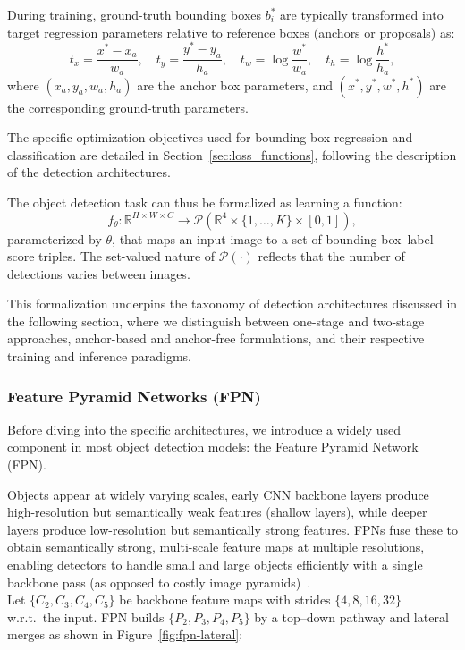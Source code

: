 During training, ground-truth bounding boxes $b_i^\ast$ are typically transformed into target regression parameters relative to reference boxes (anchors or proposals) as:
$$
t_x = \frac{x^\ast - x_a}{w_a}, \quad
t_y = \frac{y^\ast - y_a}{h_a}, \quad
t_w = \log \frac{w^\ast}{w_a}, \quad
t_h = \log \frac{h^\ast}{h_a},
$$
where $(x_a, y_a, w_a, h_a)$ are the anchor box parameters, and $(x^\ast, y^\ast, w^\ast, h^\ast)$ are the corresponding ground-truth parameters.

The specific optimization objectives used for bounding box regression and classification are detailed in Section~\ref{sec:loss_functions}, following the description of the detection architectures.

The object detection task can thus be formalized as learning a function:
$$
f_\theta: \mathbb{R}^{H \times W \times C} \to \mathcal{P}(\mathbb{R}^4 \times \{1, \dots, K\} \times [0,1]),
$$
parameterized by $\theta$, that maps an input image to a set of bounding box--label--score triples.
The set-valued nature of $\mathcal{P}(\cdot)$ reflects that the number of detections varies between images.

This formalization underpins the taxonomy of detection architectures discussed in the following section, where we distinguish between one-stage and two-stage approaches, anchor-based and anchor-free formulations, and their respective training and inference paradigms.

\subsubsection{Feature Pyramid Networks (FPN)}
Before diving into the specific architectures, we introduce a widely used component in most object detection models: the Feature Pyramid Network (FPN).

Objects appear at widely varying scales, early CNN backbone layers produce high-resolution but semantically weak features (shallow layers), while deeper layers produce low-resolution but semantically strong features.
FPNs fuse these to obtain semantically strong, multi-scale feature maps at multiple resolutions, enabling detectors to handle small and large objects efficiently with a single backbone pass (as opposed to costly image pyramids)~\cite{lin2017fpn}.\\

Let $\{C_2,C_3,C_4,C_5\}$ be backbone feature maps with strides $\{4,8,16,32\}$ w.r.t.\ the input.
FPN builds $\{P_2,P_3,P_4,P_5\}$ by a top–down pathway and lateral merges as shown in Figure~\ref{fig:fpn-lateral}:

